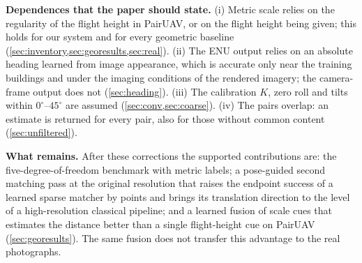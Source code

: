 \noindent\textbf{Dependences that the paper should state.} (i) Metric scale relies on the regularity of the flight height in PairUAV, or on the flight height being given; this holds for our system and for every geometric baseline (\cref{sec:inventory,sec:georesults,sec:real}). (ii) The ENU output relies on an absolute heading learned from image appearance, which is accurate only near the training buildings and under the imaging conditions of the rendered imagery; the camera-frame output does not (\cref{sec:heading}). (iii) The calibration $K$, zero roll and tilts within $0^\circ$--$45^\circ$ are assumed (\cref{sec:conv,sec:coarse}). (iv) The pairs overlap: an estimate is returned for every pair, also for those without common content (\cref{sec:unfiltered}).

\noindent\textbf{What remains.} After these corrections the supported contributions are: the five-degree-of-freedom benchmark with metric labels; a pose-guided second matching pass at the original resolution that raises the endpoint success of a learned sparse matcher by \gainSReCam{} points and brings its translation direction to the level of a high-resolution classical pipeline; and a learned fusion of scale cues that estimates the distance better than a single flight-height cue on PairUAV (\cref{sec:georesults}). The same fusion does not transfer this advantage to the real photographs.
